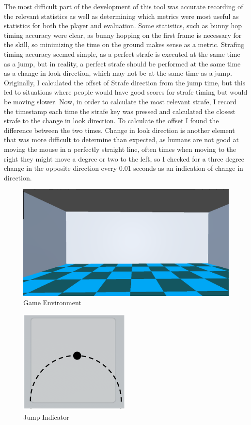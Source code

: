 \documentclass[10pt,twocolumn]{article}
\begin{document}
The most difficult part of the development of this tool was accurate recording of the relevant statistics as well as determining which metrics were most useful as statistics for both the player and evaluation. Some statistics, such as bunny hop timing accuracy were clear, as bunny hopping on the first frame is necessary for the skill, so minimizing the time on the ground makes sense as a metric. Strafing timing accuracy seemed simple, as a perfect strafe is executed at the same time as a jump, but in reality, a perfect strafe should be performed at the same time as a change in look direction, which may not be at the same time as a jump. Originally, I calculated the offset of Strafe direction from the jump time, but this led to situations where people would have good scores for strafe timing but would be moving slower. Now, in order to calculate the most relevant strafe, I record the timestamp each time the strafe key was pressed and calculated the closest strafe to the change in look direction. To calculate the offset I found the difference between the two times. Change in look direction is another element that was more difficult to determine than expected, as humans are not good at moving the mouse in a perfectly straight line, often times when moving to the right they might move a degree or two to the left, so I checked for a three degree change in the opposite direction every 0.01 seconds as an indication of change in direction. 

\begin{figure}
    \centering
    \includegraphics[width=1\linewidth]{gameEnvironment.png}
    \caption{Game Environment}
\end{figure}
\begin{figure}
    \centering
    \includegraphics[width=0.5\linewidth]{JumpIndidcator.png}
    \caption{Jump Indicator}
\end{figure}
\end{document}
